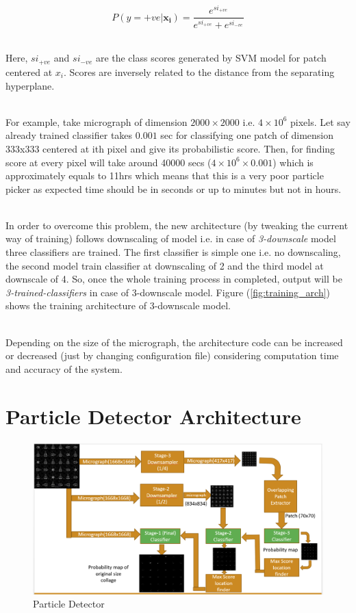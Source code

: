 \documentclass{report}
\begin{document}
\begin{equation}\label{eq:softmax}
    P(y=+ve | \boldsymbol{x_i}) = \frac{e^{si_{+ve}}}{e^{si_{+ve}}+e^{si_{-ve}}}
\end{equation}

\noindent\\
Here, $si_{+ve}$ and $si_{-ve}$ are the class scores generated by SVM model for patch centered at $x_i$. Scores are inversely related to the distance from  the separating hyperplane. 

\noindent\\
For example, take micrograph of dimension $2000\times2000$ i.e. $4\times10^6$ pixels. Let say already trained classifier takes $0.001$ sec for classifying one patch of dimension 333x333 centered at ith pixel and give its probabilistic score. Then, for finding score at every pixel will take around 40000 secs ($4\times10^6\times0.001$) which is approximately equals to 11hrs which means that this is a very poor particle picker as expected time should be in seconds or up to minutes but not in hours.


\noindent\\
In order to overcome this problem, the new architecture (by tweaking the current way of training) follows downscaling of model i.e. in case of \textit{3-downscale} model three classifiers are trained.  The first classifier is simple one i.e. no downscaling, the second model train classifier at downscaling of 2 and the third model at downscale of 4. So, once the whole training process in completed, output will be \textit{3-trained-classifiers} in case of 3-downscale model. Figure (\ref{fig:training_arch}) shows the training architecture of 3-downscale model.

\noindent\\
Depending on the size of the micrograph, the architecture code can be increased or decreased (just by changing configuration file) considering computation time and accuracy of the system. 

\section{Particle Detector Architecture}\label{sec:detector_ach}

\begin{figure}[H]
\includegraphics[width=1\textwidth]{test_arch_1}
\centering
\captionsetup{justification=centering}
\caption{Particle Detector}
\label{fig:test_arch}
\end{figure}
\end{document}
